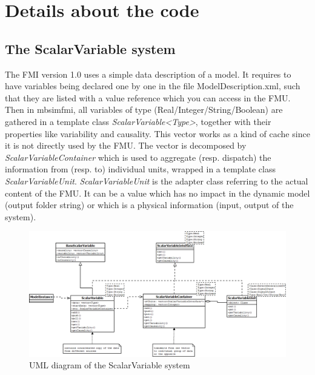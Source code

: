 \documentclass[10pt,a4paper]{report}
\begin{document}
\section{Details about the code}
%
\subsection*{The ScalarVariable system}
The FMI version 1.0 uses a simple data description of a model. It requires to have variables being declared one by one in the file ModelDescription.xml, such that they are listed with a value reference which you can access in the FMU. Then in mbsimfmi, all variables of type (Real/Integer/String/Boolean) are gathered in a template class \emph{ScalarVariable<Type>}, together with their properties like variability and causality. This vector works as a kind of cache since it is not directly used by the FMU. The vector is decomposed by \emph{ScalarVariableContainer} which is used to aggregate (resp. dispatch) the information from (resp. to) individual units, wrapped in a template class \emph{ScalarVariableUnit}. \emph{ScalarVariableUnit} is the adapter class referring to the actual content of the FMU. It can be a value which has no impact in the dynamic model (output folder string) or which is a physical information (input, output of the system).
%
\begin{figure}[h]
	\centering
	\includegraphics[width=\textwidth]{scalarvar}
	\caption{UML diagram of the ScalarVariable system}
	\label{fig:umlSV}
\end{figure}
%
\end{document}
